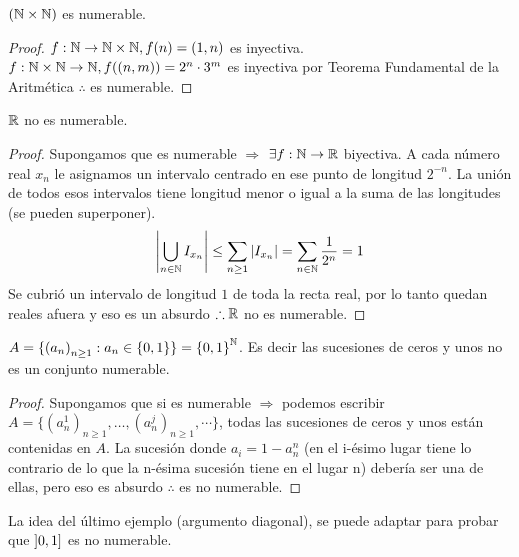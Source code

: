 \begin{eg}
	\((\mathbb{N} \times \mathbb{N})\) es numerable.
	\begin{proof}
		\(f: \mathbb{N} \to \mathbb{N}\times \mathbb{N}, f(n)=(1, n)\) es inyectiva.
		\(f: \mathbb{N}\times \mathbb{N} \to \mathbb{N} , f((n, m))= 2^n \cdot 3^m\) es inyectiva por Teorema Fundamental de la Aritmética \(\therefore \) es numerable.
	\end{proof}
\end{eg}

\begin{theorem}
	\(\mathbb{R} \)  no es numerable.
	\begin{proof}
		Supongamos que es numerable \(\Rightarrow \)
		\(\exists f: \mathbb{N} \to \mathbb{R} \) biyectiva. A cada número real \(x_n\) le asignamos un intervalo centrado en ese punto de longitud \(2^{-n} \). La unión de todos esos intervalos tiene longitud menor o igual a la suma de las longitudes (se pueden superponer).
		\begin{align*}
			\left|\bigcup_{n \in \mathbb{N}} I_{x_n}\right| \leq \sum_{n \geq 1} |I_{x_n}| = \sum_{n \in \mathbb{N}}\dfrac{1}{2^n} = 1
		\end{align*}
		Se cubrió un intervalo de longitud \(1\) de toda la recta real, por lo tanto quedan reales afuera y eso es un absurdo \(\therefore \mathbb{R} \) no es numerable.
	\end{proof}
\end{theorem}

\begin{eg}
	\(A = \{ {(a_n)}_{n \geq 1} : a_n \in \{0, 1\} \} = {\{0, 1\}}^{\mathbb{N}} \). Es decir las sucesiones de ceros y unos no es un conjunto numerable.
	\begin{proof}
		Supongamos que si es numerable \(\Rightarrow \) podemos escribir \\ \(A = \{ {(a_n^1)}_{n\geq1}, \ldots, {(a_n^j)}_{n\geq1}, \cdots \} \), todas las sucesiones de ceros y unos están contenidas en \(A\). La sucesión donde \(a_i=1-a_n^n\) (en el i-ésimo lugar tiene lo contrario de lo que la n-ésima sucesión tiene en el lugar n) debería ser una de ellas, pero eso es absurdo \(\therefore \) es no numerable.
	\end{proof}
\end{eg}

La idea del último ejemplo (argumento diagonal), se puede adaptar para probar que \( \interval[open left]{0}{1} \) es no numerable.


